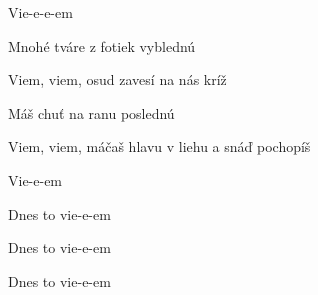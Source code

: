 \begin{song}
Vie-e-e-em \par

\bigskip

 Mnohé tváre z fotiek vyblednú \par
Viem, viem, osud zavesí na nás kríž  \par
{} Máš chuť na ranu poslednú \par
Viem, viem, máčaš hlavu v liehu a snáď pochopíš \par

\bigskip

\PredrefrenARefren

\bigskip

Vie-e-em \par
Dnes to vie-e-em \par
Dnes to vie-e-em \par
Dnes to vie-e-em \par

\end{song}
